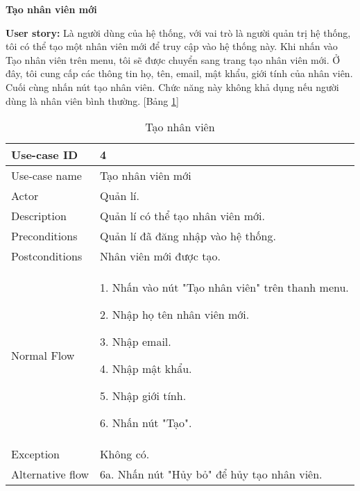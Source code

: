 \textbf{Tạo nhân viên mới}\par
\textbf{User story:} Là người dùng của hệ thống, với vai trò là người quản trị hệ thống, tôi có thể tạo một nhân viên mới để truy cập vào hệ thống này. Khi nhấn vào Tạo nhân viên trên menu, tôi sẽ được chuyển sang trang tạo nhân viên mới. Ở đây, tôi cung cấp các thông tin họ, tên, email, mật khẩu, giới tính của nhân viên. Cuối cùng nhấn nút tạo nhân viên. Chức năng này không khả dụng nếu người dùng là nhân viên bình thường. [Bảng \ref{bang15}]
\begin{table}[H]
    \centering
    \begin{tabular}{|m{3cm}|m{10cm}|}
    \hline 
        Use-case ID & 4\\ \hline
        Use-case name & Tạo nhân viên mới\\ \hline
        Actor & Quản lí.\\ \hline
        Description & Quản lí có thể tạo nhân viên mới.\\ \hline
        Preconditions & Quản lí đã đăng nhập vào hệ thống.\\ \hline
        Postconditions & Nhân viên mới được tạo.\\ \hline
        Normal Flow & 
        1. Nhấn vào nút "Tạo nhân viên" trên thanh menu.\par 
        2. Nhập họ tên nhân viên mới.\par
        3. Nhập email.\par
        4. Nhập mật khẩu.\par
        5. Nhập giới tính.\par
        6. Nhấn nút "Tạo".
        \\ \hline
        Exception & Không có.
        \\ \hline
        Alternative flow & 
        6a. Nhấn nút "Hủy bỏ" để hủy tạo nhân viên.
        \\ 
    \hline 
    \end{tabular}
    \caption{Tạo nhân viên}
    \label{bang15}
\end{table}



